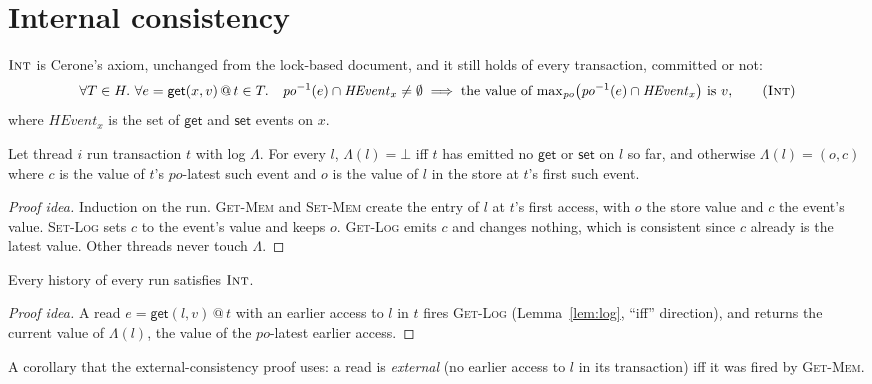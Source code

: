 \documentclass[manuscript,nonacm]{acmart}
\makeatletter
\theoremstyle{acmdefinition}
\newcommand{\getev}[3]{\textsf{get}(#1,#2)\,@\,#3}
\newcommand{\HEvent}{\mathit{HEvent}}
\newcommand{\po}{\mathit{po}}
\newcommand{\maxpo}{\mathrm{max}_{\po}}
\newcommand{\Lg}{\Lambda}                         %
\makeatother
\begin{document}
\section{Internal consistency}
\label{sec:int}

$\textsc{Int}$ is Cerone's axiom, unchanged from the lock-based document, and
it still holds of every transaction, committed or not:
\[
\forall T \in H.\ \forall e = \getev{x}{v}{t} \in T.\quad
\po^{-1}(e) \cap \HEvent_x \neq \emptyset \implies
\text{the value of } \maxpo\bigl(\po^{-1}(e) \cap \HEvent_x\bigr) \text{ is } v ,
\tag{$\textsc{Int}$}
\]
where $\HEvent_x$ is the set of $\textsf{get}$ and $\textsf{set}$ events on $x$.

\begin{lemma}
\label{lem:log}
Let thread $i$ run transaction $t$ with log $\Lg$. For every $l$,
$\Lg(l) = \bot$ iff $t$ has emitted no $\textsf{get}$ or $\textsf{set}$
on $l$ so far, and otherwise $\Lg(l) = (o,c)$ where $c$ is the value of $t$'s
$\po$-latest such event and $o$ is the value of $l$ in the store at $t$'s
first such event.
\end{lemma}
\begin{proof}[Proof idea]
Induction on the run. \textsc{Get-Mem} and \textsc{Set-Mem} create the entry
of $l$ at $t$'s first access, with $o$ the store value and $c$ the event's
value. \textsc{Set-Log} sets $c$ to the event's value and keeps $o$.
\textsc{Get-Log} emits $c$ and changes nothing, which is consistent since $c$
already is the latest value. Other threads never touch $\Lg$.
\end{proof}

\begin{theorem}
Every history of every run satisfies $\textsc{Int}$.
\end{theorem}
\begin{proof}[Proof idea]
A read $e = \getev{l}{v}{t}$ with an earlier access to $l$ in $t$ fires
\textsc{Get-Log} (Lemma~\ref{lem:log}, ``iff'' direction), and returns
the current value of $\Lg(l)$, the value of the $\po$-latest earlier access.
\end{proof}

A corollary that the external-consistency proof uses: a read is \emph{external}
(no earlier access to $l$ in its transaction) iff it was fired by
\textsc{Get-Mem}.

\end{document}
